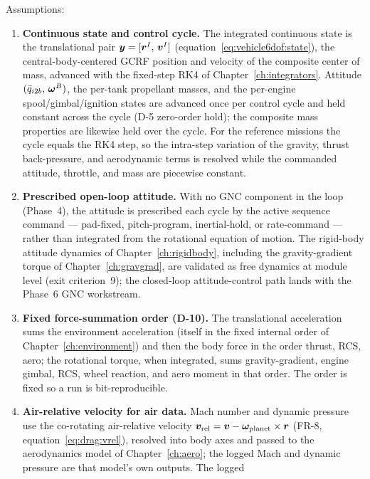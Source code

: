 Assumptions:
\begin{enumerate}
  \item \textbf{Continuous state and control cycle.} The integrated
    continuous state is the translational pair
    $\bm{y} = [\bm{r}^{I},\, \bm{v}^{I}]$
    (equation~\eqref{eq:vehicle6dof:state}), the central-body-centered GCRF
    position and velocity of the composite center of mass, advanced with the
    fixed-step RK4 of Chapter~\ref{ch:integrators}. Attitude
    $(\bar{q}_{i2b},\, \bm{\omega}^{B})$, the per-tank propellant masses,
    and the per-engine spool/gimbal/ignition states are advanced once per
    control cycle and held constant across the cycle (D-5 zero-order hold);
    the composite mass properties are likewise held over the cycle. For the
    reference missions the cycle equals the RK4 step, so the intra-step
    variation of the gravity, thrust back-pressure, and aerodynamic terms is
    resolved while the commanded attitude, throttle, and mass are piecewise
    constant.
  \item \textbf{Prescribed open-loop attitude.} With no GNC component in the
    loop (Phase~4), the attitude is prescribed each cycle by the active
    sequence command --- pad-fixed, pitch-program, inertial-hold, or
    rate-command --- rather than integrated from the rotational equation of
    motion. The rigid-body attitude dynamics of Chapter~\ref{ch:rigidbody},
    including the gravity-gradient torque of Chapter~\ref{ch:gravgrad}, are
    validated as free dynamics at module level (exit criterion~9); the
    closed-loop attitude-control path lands with the Phase~6 GNC workstream.
  \item \textbf{Fixed force-summation order (D-10).} The translational
    acceleration sums the environment acceleration (itself in the fixed
    internal order of Chapter~\ref{ch:environment}) and then the body force
    in the order thrust, RCS, aero; the rotational torque, when integrated,
    sums gravity-gradient, engine gimbal, RCS, wheel reaction, and aero
    moment in that order. The order is fixed so a run is bit-reproducible.
  \item \textbf{Air-relative velocity for air data.} Mach number and dynamic
    pressure use the co-rotating air-relative velocity
    $\bm{v}_{\mathrm{rel}} = \bm{v} - \bm{\omega}_{\mathrm{planet}} \times
    \bm{r}$ (FR-8, equation~\eqref{eq:drag:vrel}), resolved into body axes
    and passed to the aerodynamics model of Chapter~\ref{ch:aero}; the logged
    Mach and dynamic pressure are that model's own outputs. The logged

\end{enumerate}
